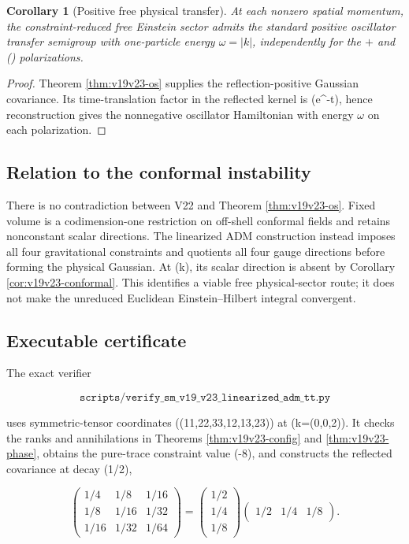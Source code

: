 \documentclass[11pt]{article}
\newtheorem{corollary}[theorem]{Corollary}
\theoremstyle{remark}
\begin{document}
\begin{corollary}[Positive free physical transfer]
\label{cor:v19v23-transfer}
At each nonzero spatial momentum, the constraint-reduced free Einstein
sector admits the standard positive oscillator transfer semigroup with
one-particle energy \(\omega=|k|\), independently for the \(+\) and
(\times) polarizations.
\end{corollary}

\begin{proof}
Theorem \ref{thm:v19v23-os} supplies the reflection-positive Gaussian
covariance.  Its time-translation factor in the reflected kernel is
(e^{-\omega t}), hence reconstruction gives the nonnegative oscillator
Hamiltonian with energy \(\omega\) on each polarization.
\end{proof}

\subsection{Relation to the conformal instability}

There is no contradiction between V22 and Theorem
\ref{thm:v19v23-os}.  Fixed volume is a codimension-one restriction on
off-shell conformal fields and retains nonconstant scalar directions.  The
linearized ADM construction instead imposes all four gravitational
constraints and quotients all four gauge directions before forming the
physical Gaussian.  At (k), its scalar direction is absent by
Corollary \ref{cor:v19v23-conformal}.  This identifies a viable free
physical-sector route; it does not make the unreduced Euclidean
Einstein--Hilbert integral convergent.

\subsection{Executable certificate}

The exact verifier

\[
 \texttt{scripts/verify\_sm\_v19\_v23\_linearized\_adm\_tt.py} \tag{26.19}
\]

uses symmetric-tensor coordinates
((11,22,33,12,13,23)) at (k=(0,0,2)).  It checks the ranks and
annihilations in Theorems \ref{thm:v19v23-config} and
\ref{thm:v19v23-phase}, obtains the pure-trace constraint value (-8),
and constructs the reflected covariance at decay (1/2),

\[
 \begin{pmatrix}
  1/4&1/8&1/16\\
  1/8&1/16&1/32\\
  1/16&1/32&1/64
 \end{pmatrix}
 =
 \begin{pmatrix}1/2\\1/4\\1/8\end{pmatrix}
 \begin{pmatrix}1/2&1/4&1/8\end{pmatrix}.                    \tag{26.20}
\]
\end{document}
